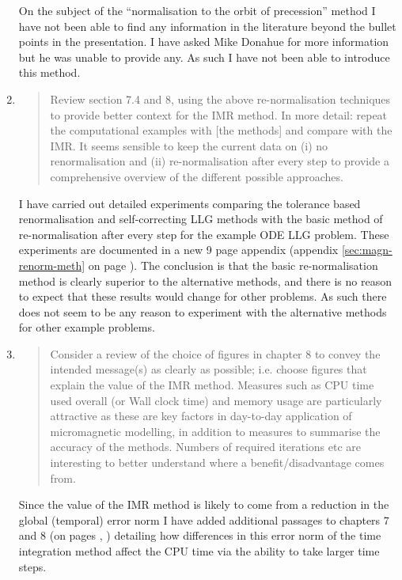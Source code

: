 \documentclass[12pt,a4paper,pdftex]{article}
\begin{document}
\begin{enumerate}
  On the subject of the ``normalisation to the orbit of precession'' method I have not been able to find any information in the literature beyond the bullet points in the presentation.
  I have asked Mike Donahue for more information but he was unable to provide any.
  As such I have not been able to introduce this method.

\item
  \begin{quotation}
    Review section 7.4 and 8, using the above re-normalisation techniques
    to provide better context for the IMR method. In more detail: repeat
    the computational examples with [the methods] and compare with the IMR.
    It seems sensible to keep the current data on (i) no renormalisation
    and (ii) re-normalisation after every step to provide a comprehensive
    overview of the different possible approaches.
  \end{quotation}
  I have carried out detailed experiments comparing the tolerance based renormalisation and self-correcting LLG methods with the basic method of re-normalisation after every step for the example ODE LLG problem.
  These experiments are documented in a new 9 page appendix (appendix \ref{sec:magn-renorm-meth} on page \pageref{sec:magn-renorm-meth}).
  The conclusion is that the basic re-normalisation method is clearly superior to the alternative methods, and there is no reason to expect that these results would change for other problems.
  As such there does not seem to be any reason to experiment with the alternative methods for other example problems.

\item
  \begin{quotation}
    Consider a review of the choice of figures in chapter 8 to convey
    the intended message(s) as clearly as possible; i.e. choose figures
    that explain the value of the IMR method. Measures such as CPU time
    used overall (or Wall clock time) and memory usage are particularly
    attractive as these are key factors in day-to-day application of
    micromagnetic modelling, in addition to measures to summarise the
    accuracy of the methods. Numbers of required iterations etc are
    interesting to better understand where a benefit/disadvantage comes
    from.
  \end{quotation}
  Since the value of the IMR method is likely to come from a reduction in the global (temporal) error norm I have added additional passages to chapters 7 and 8 (on pages \pageref{cpu-correction-1}, \pageref{cpu-correction-2}) detailing how differences in this error norm of the time integration method affect the CPU time via the ability to take larger time steps.


\end{enumerate}
\end{document}

